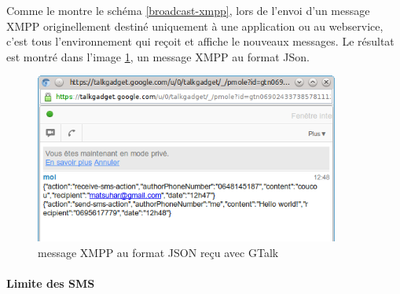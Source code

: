 Comme le montre le schéma \ref{broadcast-xmpp}, lors de l'envoi d'un message XMPP originellement destiné uniquement
à une application ou au webservice, c'est tous l'environnement qui reçoit et affiche le nouveaux messages.
Le résultat est montré dans l'image \ref{message-xmpp-json-gmail}, un message XMPP au format JSon. 
	
\begin{figure}[!h]
	\center
	\includegraphics[width=10cm]{img/message-xmpp-json-gmail.png}
	\caption{message XMPP au format JSON reçu avec GTalk}
	\label{message-xmpp-json-gmail}
\end{figure}

\paragraph{Limite des SMS}

